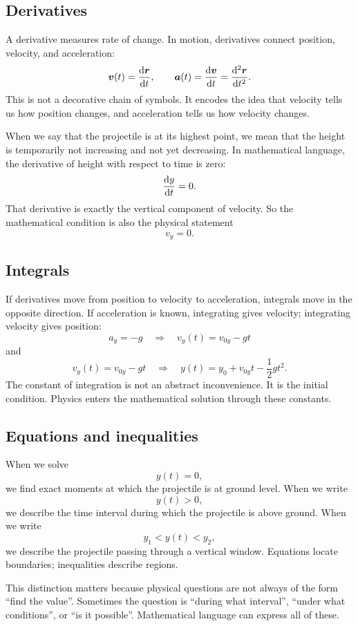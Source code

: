 \documentclass[11pt,a4paper]{article}
\newcommand{\vect}[1]{\boldsymbol{#1}}
\begin{document}
\subsection{Derivatives}

A derivative measures rate of change. In motion, derivatives connect position, velocity, and acceleration:
\[
\vect v(t)=\dv{\vect r}{t}, \qquad \vect a(t)=\dv{\vect v}{t}=\dv[2]{\vect r}{t}.
\]
This is not a decorative chain of symbols. It encodes the idea that velocity tells us how position changes, and acceleration tells us how velocity changes.

When we say that the projectile is at its highest point, we mean that the height is temporarily not increasing and not yet decreasing. In mathematical language, the derivative of height with respect to time is zero:
\[
\dv{y}{t}=0.
\]
That derivative is exactly the vertical component of velocity. So the mathematical condition is also the physical statement
\[
v_y=0.
\]

\subsection{Integrals}

If derivatives move from position to velocity to acceleration, integrals move in the opposite direction. If acceleration is known, integrating gives velocity; integrating velocity gives position:
\[
a_y=-g \quad\Longrightarrow\quad v_y(t)=v_{0y}-gt
\]
and
\[
v_y(t)=v_{0y}-gt \quad\Longrightarrow\quad y(t)=y_0+v_{0y}t-\frac12gt^2.
\]
The constant of integration is not an abstract inconvenience. It is the initial condition. Physics enters the mathematical solution through these constants.

\subsection{Equations and inequalities}

When we solve
\[
y(t)=0,
\]
we find exact moments at which the projectile is at ground level. When we write
\[
y(t)>0,
\]
we describe the time interval during which the projectile is above ground. When we write
\[
y_1<y(t)<y_2,
\]
we describe the projectile passing through a vertical window. Equations locate boundaries; inequalities describe regions.

This distinction matters because physical questions are not always of the form ``find the value''. Sometimes the question is ``during what interval'', ``under what conditions'', or ``is it possible''. Mathematical language can express all of these.
\end{document}
